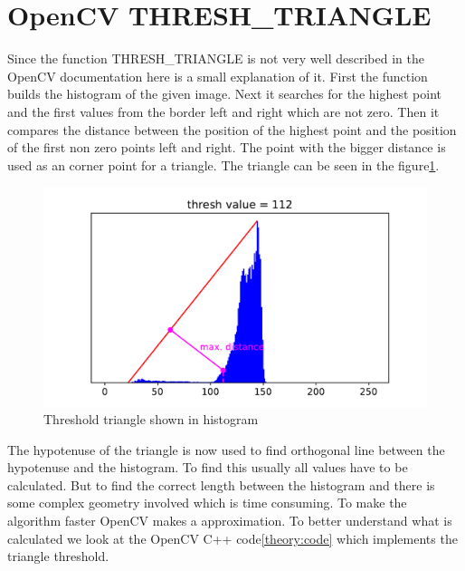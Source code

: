 \newpage
\section{OpenCV THRESH\_TRIANGLE }
Since the function THRESH\_TRIANGLE is not very well described in the OpenCV documentation here is a small explanation of it. First the function builds the histogram of the given image. Next it searches for the highest point and the first values from the border left and right which are not zero. Then it compares the distance between the position of the highest point and the position of the first non zero points left and right. The point with the bigger distance is used as an corner point for a triangle. The triangle can be seen in the figure\ref{theory:triangle}.

\begin{figure}[ht]
	\centering
	\includegraphics[width=\textwidth]{2-theory/threshold/triangle.pdf}
	\caption{Threshold triangle shown in histogram\label{theory:triangle}}
\end{figure} 
The hypotenuse of the triangle is now used to find orthogonal line between the hypotenuse and the histogram. To find this usually all values have to be calculated. But to find the correct length between the histogram and there is some complex geometry involved which is time consuming. To make the algorithm faster OpenCV makes a approximation. To better understand what is calculated we look at the OpenCV C++ code\ref{theory:code} which implements the triangle threshold. 


\lstset{style=mystyle}


